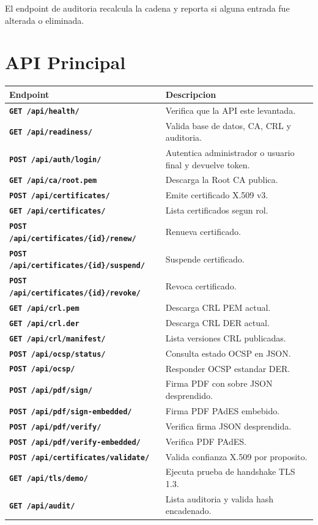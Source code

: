 \documentclass[12pt,a4paper]{article}
\begin{document}
El endpoint de auditoria recalcula la cadena y reporta si alguna entrada fue alterada o eliminada.

\section{API Principal}

\begin{longtable}{>{\bfseries}p{4.2cm}p{9.8cm}}
\toprule
Endpoint & Descripcion \\
\midrule
\texttt{GET /api/health/} & Verifica que la API este levantada. \\
\texttt{GET /api/readiness/} & Valida base de datos, CA, CRL y auditoria. \\
\texttt{POST /api/auth/login/} & Autentica administrador o usuario final y devuelve token. \\
\texttt{GET /api/ca/root.pem} & Descarga la Root CA publica. \\
\texttt{POST /api/certificates/} & Emite certificado X.509 v3. \\
\texttt{GET /api/certificates/} & Lista certificados segun rol. \\
\texttt{POST /api/certificates/\{id\}/renew/} & Renueva certificado. \\
\texttt{POST /api/certificates/\{id\}/suspend/} & Suspende certificado. \\
\texttt{POST /api/certificates/\{id\}/revoke/} & Revoca certificado. \\
\texttt{GET /api/crl.pem} & Descarga CRL PEM actual. \\
\texttt{GET /api/crl.der} & Descarga CRL DER actual. \\
\texttt{GET /api/crl/manifest/} & Lista versiones CRL publicadas. \\
\texttt{POST /api/ocsp/status/} & Consulta estado OCSP en JSON. \\
\texttt{POST /api/ocsp/} & Responder OCSP estandar DER. \\
\texttt{POST /api/pdf/sign/} & Firma PDF con sobre JSON desprendido. \\
\texttt{POST /api/pdf/sign-embedded/} & Firma PDF PAdES embebido. \\
\texttt{POST /api/pdf/verify/} & Verifica firma JSON desprendida. \\
\texttt{POST /api/pdf/verify-embedded/} & Verifica PDF PAdES. \\
\texttt{POST /api/certificates/validate/} & Valida confianza X.509 por proposito. \\
\texttt{GET /api/tls/demo/} & Ejecuta prueba de handshake TLS 1.3. \\
\texttt{GET /api/audit/} & Lista auditoria y valida hash encadenado. \\
\bottomrule
\end{longtable}
\end{document}
